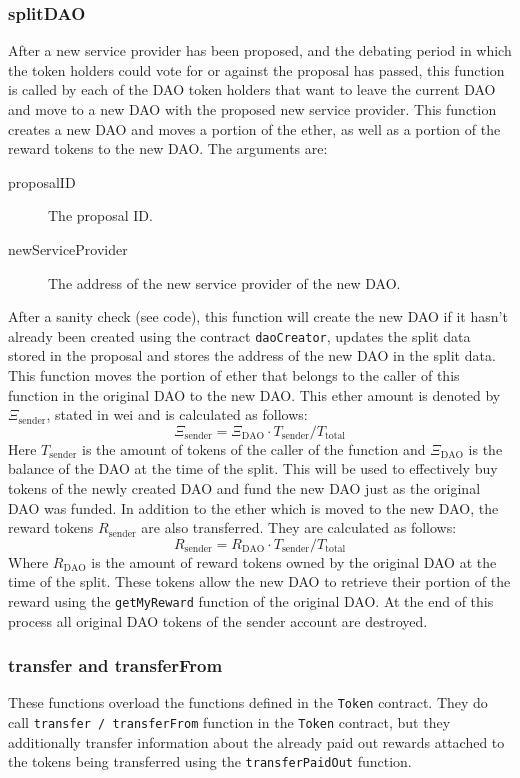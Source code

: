\documentclass[9pt,oneside]{amsart}
\begin{document}
\begin{multicols}{2}
\subsubsection*{splitDAO}
After a new service provider has been proposed, and the debating period in which the token holders could vote for or against the proposal has passed, this function is called by each of the DAO token holders that want to leave the current DAO and move to a new DAO with the proposed new service provider. This function creates a new DAO and moves a portion of the ether, as well as a portion of the reward tokens to the new DAO.
The arguments are:
\begin{description}
 \item[proposalID] The proposal ID.
 \item[newServiceProvider] The address of the new service provider of the new DAO.
\end{description}
After a sanity check (see code), this function will create the new DAO if it hasn’t already been created using the contract \verb|daoCreator|, updates the split data stored in the proposal and stores the address of the new DAO in the split data.
This function moves the portion of ether that belongs to the caller of this function in the original DAO to the new DAO. This ether amount is denoted by $\Xi_{\text{sender}}$, stated in wei and is calculated as follows:
\begin{equation}
 \Xi_{\text{sender}} = \Xi_{\text{DAO}} \cdot T_{\text{sender}} / T_{\text{total}}
\end{equation}
Here $T_{\text{sender}}$ is the amount of tokens of the caller of the function and $\Xi_{\text{DAO}}$ is the balance of the DAO at the time of the split.
This will be used to effectively buy tokens of the newly created DAO and fund the new DAO just as the original DAO was funded.
In addition to the ether which is moved to the new DAO, the reward tokens $R_{\text{sender}}$ are also transferred. 
They are calculated as follows:
\begin{equation}
 R_{\text{sender}} = R_{\text{DAO}} \cdot T_{\text{sender}} / T_{\text{total}}
\end{equation}
Where $R_{\text{DAO}}$ is the amount of reward tokens owned by the original DAO at the time of the split. These tokens allow the new DAO to retrieve their portion of the reward using the \verb|getMyReward| function of the original DAO.
At the end of this process all original DAO tokens of the sender account are destroyed.

\subsubsection*{transfer and transferFrom}
These functions overload the functions defined in the \verb|Token| contract. They do call \verb|transfer / transferFrom| function in the \verb|Token| contract, but they additionally transfer information about the already paid out rewards attached to the tokens being transferred using the \verb|transferPaidOut| function. 


\end{multicols}
\end{document}
